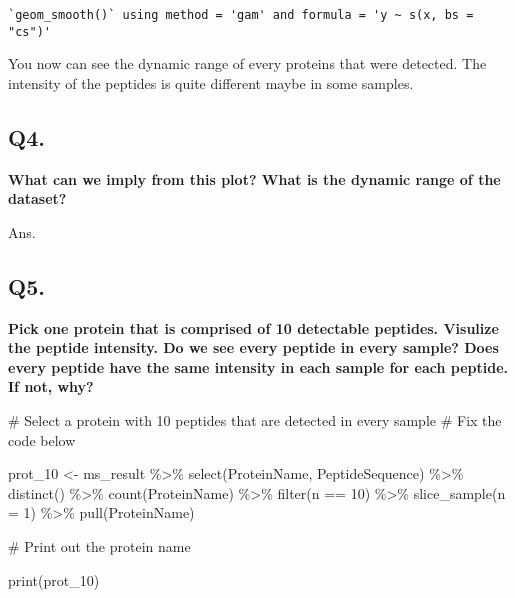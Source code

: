 \documentclass[
  letterpaper,
  DIV=11,
  numbers=noendperiod]{scrartcl}
\newenvironment{Shaded}{\begin{snugshade}}{\end{snugshade}}
\newcommand{\AttributeTok}[1]{\textcolor[rgb]{0.40,0.45,0.13}{#1}}
\newcommand{\CommentTok}[1]{\textcolor[rgb]{0.37,0.37,0.37}{#1}}
\newcommand{\DecValTok}[1]{\textcolor[rgb]{0.68,0.00,0.00}{#1}}
\newcommand{\FunctionTok}[1]{\textcolor[rgb]{0.28,0.35,0.67}{#1}}
\newcommand{\NormalTok}[1]{\textcolor[rgb]{0.00,0.23,0.31}{#1}}
\newcommand{\OtherTok}[1]{\textcolor[rgb]{0.00,0.23,0.31}{#1}}
\newcommand{\SpecialCharTok}[1]{\textcolor[rgb]{0.37,0.37,0.37}{#1}}
\begin{document}
\begin{verbatim}
`geom_smooth()` using method = 'gam' and formula = 'y ~ s(x, bs = "cs")'
\end{verbatim}


You now can see the dynamic range of every proteins that were detected.
The intensity of the peptides is quite different maybe in some samples.

\subsection{Q4.}\label{q4.}

\textbf{What can we imply from this plot? What is the dynamic range of
the dataset?}

Ans.

\subsection{Q5.}\label{q5.}

\textbf{Pick one protein that is comprised of 10 detectable peptides.
Visulize the peptide intensity. Do we see every peptide in every sample?
Does every peptide have the same intensity in each sample for each
peptide. If not, why?}

\begin{Shaded}
\begin{Highlighting}[]
\CommentTok{\# Select a protein with 10 peptides that are detected in every sample}
\CommentTok{\# Fix the code below}

\NormalTok{prot\_10 }\OtherTok{\textless{}{-}}\NormalTok{ ms\_result }\SpecialCharTok{\%\textgreater{}\%} 
  \FunctionTok{select}\NormalTok{(ProteinName, PeptideSequence) }\SpecialCharTok{\%\textgreater{}\%}
  \FunctionTok{distinct}\NormalTok{() }\SpecialCharTok{\%\textgreater{}\%}
  \FunctionTok{count}\NormalTok{(ProteinName) }\SpecialCharTok{\%\textgreater{}\%}
  \FunctionTok{filter}\NormalTok{(n }\SpecialCharTok{==} \DecValTok{10}\NormalTok{) }\SpecialCharTok{\%\textgreater{}\%}
  \FunctionTok{slice\_sample}\NormalTok{(}\AttributeTok{n =} \DecValTok{1}\NormalTok{) }\SpecialCharTok{\%\textgreater{}\%} 
  \FunctionTok{pull}\NormalTok{(ProteinName)}

\CommentTok{\# Print out the protein name}

\FunctionTok{print}\NormalTok{(prot\_10)}
\end{Highlighting}
\end{Shaded}
\end{document}
